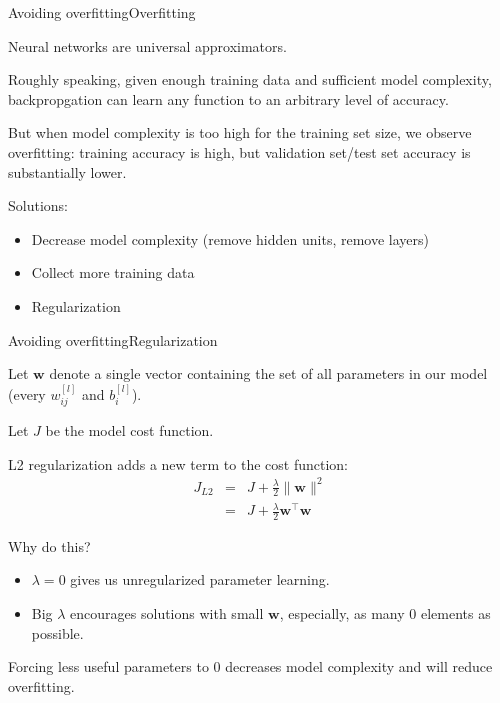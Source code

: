\documentclass{beamer}
\renewcommand{\vec}[1]{\boldsymbol{#1}}
\begin{document}
\begin{frame}{Avoiding overfitting}{Overfitting}

  Neural networks are \alert{universal approximators}.

  \medskip

  Roughly speaking, given enough training data and sufficient model
  complexity, backpropgation can learn \alert{any function} to an
  arbitrary level of accuracy.

  \medskip

  But when model complexity is too high for the training set size, we
  observe \alert{overfitting}: training accuracy is high, but
  validation set/test set accuracy is substantially lower.

  \medskip

  Solutions:
  \begin{itemize}
  \item Decrease model complexity (remove hidden units, remove layers)
  \item Collect more training data
  \item Regularization
  \end{itemize}
  
\end{frame}


\begin{frame}{Avoiding overfitting}{Regularization}

  Let $\vec{w}$ denote a single vector containing the set of all
  parameters in our model (every $w^{[l]}_{ij}$ and $b^{[l]}_i$).

  \medskip

  Let $J$ be the model cost function.

  \medskip

  L2 regularization adds a new term to the cost function:
  \begin{eqnarray*}
    J_{L2} & = & J + \frac{\lambda}{2}\|\vec{w}\|^2 \\
    & = & J + \frac{\lambda}{2}\vec{w}^\top\vec{w}
  \end{eqnarray*}

  \medskip

  Why do this?
  \begin{itemize}
  \item $\lambda=0$ gives us unregularized parameter learning.
  \item Big $\lambda$ encourages solutions with small $\vec{w}$,
    especially, \alert{as many 0 elements as possible}.
  \end{itemize}

  Forcing less useful parameters to 0 decreases model complexity and
  will reduce overfitting.
  
\end{frame}
\end{document}
